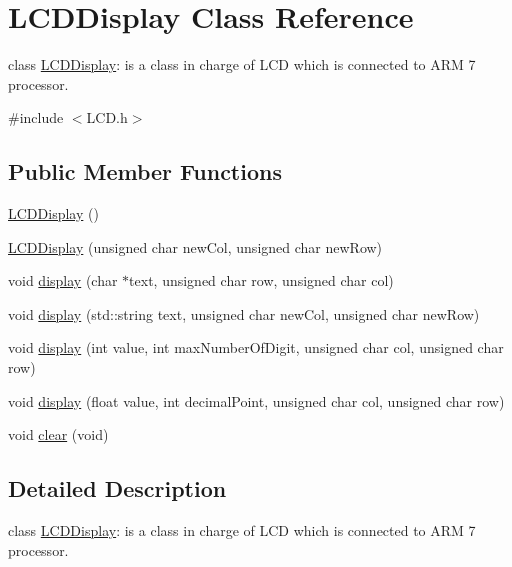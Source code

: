 \hypertarget{class_l_c_d_display}{
\section{LCDDisplay Class Reference}
\label{class_l_c_d_display}
}


class \hyperlink{class_l_c_d_display}{LCDDisplay}: is a class in charge of LCD which is connected to ARM 7 processor.  




{\ttfamily \#include $<$LCD.h$>$}

\subsection*{Public Member Functions}
\begin{DoxyCompactItemize}
\item 
\hyperlink{class_l_c_d_display_a0527cd7dafe07b1d3e26a06e24c82861}{LCDDisplay} ()
\item 
\hyperlink{class_l_c_d_display_a62c8d8c84a94215c3cff9937d89e83af}{LCDDisplay} (unsigned char newCol, unsigned char newRow)
\item 
void \hyperlink{class_l_c_d_display_a336e3f07dacfde9f3422a1c499744e9f}{display} (char $\ast$text, unsigned char row, unsigned char col)
\item 
void \hyperlink{class_l_c_d_display_a65c1bf27c97ed6f16758d0ddfddf7602}{display} (std::string text, unsigned char newCol, unsigned char newRow)
\item 
void \hyperlink{class_l_c_d_display_ab85f3f85e5126fb0a87971f2aacdc30c}{display} (int value, int maxNumberOfDigit, unsigned char col, unsigned char row)
\item 
void \hyperlink{class_l_c_d_display_a4ae3bbd3565ed7eb0d44866ce46b77f5}{display} (float value, int decimalPoint, unsigned char col, unsigned char row)
\item 
void \hyperlink{class_l_c_d_display_a5d12e8f2d63a1352646d747c1b543a8d}{clear} (void)
\end{DoxyCompactItemize}


\subsection{Detailed Description}
class \hyperlink{class_l_c_d_display}{LCDDisplay}: is a class in charge of LCD which is connected to ARM 7 processor. 

